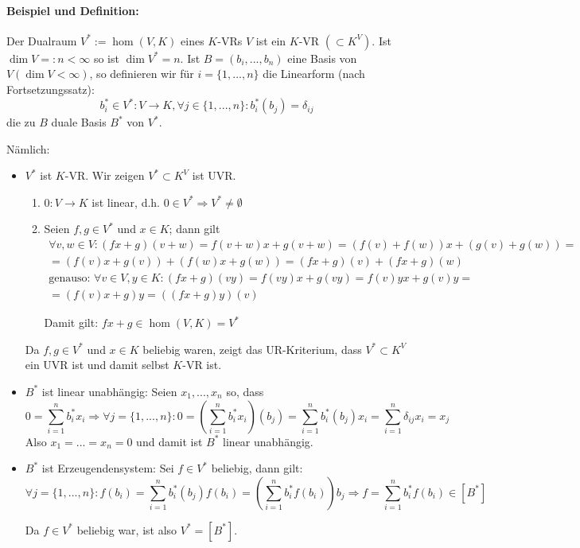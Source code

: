 \paragraph{Beispiel und Definition:}
	Der Dualraum $V^\ast := \hom(V,K)$ eines $K$-VRs $V$ ist ein $ K $-VR $(\subset K^V)$. Ist $\dim V=:n<\infty$ so ist $\dim V^\ast=n$.
	Ist $B=(b_i, ... ,b_n)$ eine Basis von $ V (\dim V < \infty)$, so definieren wir für $ i = \{1, ... ,n\} $ die Linearform (nach Fortsetzungssatz):
	\begin{equation*}
		b_i^\ast\in V^*:V\to K, \forall j\in \{1,...,n\}:b_i^*(b_j)=\delta_{ij}
	\end{equation*} die zu $ B $ duale Basis $ B^* $ von $V^\ast$.

	Nämlich:
	\begin{itemize}
	\item $ V^* $ ist $ K $-VR. Wir zeigen $ V^*\subset K^V $ ist UVR.
	\begin{enumerate}
		\item $ 0: V\to K $ ist linear, d.h. $ 0 \in V^* \Rightarrow V^* \neq \emptyset $
		\item Seien $ f,g \in V^* $ und $ x\in K $; dann gilt
			\begin{gather*}
				\forall v,w\in V: (fx+g)(v+w) = f(v+w)x+g(v+w)=(f(v)+ f(w))x+(g(v)+g(w))=\\
				=(f(v)x+g(v))+(f(w)x+g(w)) = (fx+g)(v)+(fx+g)(w)\\
				\text{genauso: } \forall v\in V, y\in K: (fx+g)(vy) = f(vy)x+g(vy) = f(v)yx + g(v)y =\\ =(f(v)x +g )y = ((fx+g)y)(v)
			\end{gather*}
			
			Damit gilt: $ fx+g\in \hom (V,K) = V^* $
	\end{enumerate}
	
	Da $ f,g\in V^* $ und $ x\in K $ beliebig waren, zeigt das UR-Kriterium, dass $ V^*\subset K^V $ ein UVR ist und damit selbst $ K $-VR ist.
	\item $ B^* $ ist linear unabhängig: Seien $ x_1,...,x_n $ so, dass
		\begin{equation*}
		0 = \sum_{i=1}^{n}b_i^*x_i \Rightarrow \forall j=\{1,...,n\}:0=(\sum_{i=1}^{n}b_i^*x_i)(b_j) = \sum_{i=1}^{n}b_i^*(b_j)x_i = \sum_{i=1}^{n}\delta_{ij}x_i = x_j
		\end{equation*}
	Also $ x_1 = ... = x_n = 0 $ und damit ist $ B^* $ linear unabhängig.
	\item $ B^* $ ist Erzeugendensystem: Sei $ f\in V^* $ beliebig, dann gilt:
	\begin{equation*}
		\forall j = \{1,...,n\}:f(b_i) = \sum_{i=1}^{n}b_i^*(b_j)f(b_i) = (\sum_{i=1}^{n}b_i^*f(b_i))b_j \Rightarrow f = \sum_{i=1}^{n}b_i^*f(b_i)\in [B^*]
	\end{equation*}
	
	Da $ f\in V^* $ beliebig war, ist also $ V^* = [B^*]$.
	\end{itemize}
	
